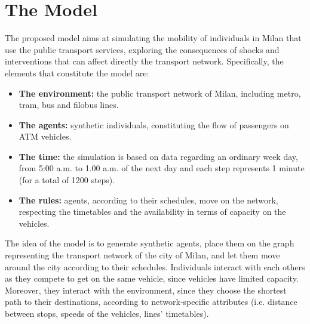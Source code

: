 \section{The Model}
The proposed model aims at simulating the mobility of individuals in Milan that use the public transport services, exploring the consequences of shocks and interventions that can affect directly the transport network. Specifically, the elements that constitute the model are:
\begin{itemize}
    \item \textbf{The environment:} the public transport network of Milan, including metro, tram, bus and filobus lines.
    \item \textbf{The agents:} synthetic individuals, constituting the flow of passengers on ATM vehicles.
    \item \textbf{The time:} the simulation is based on data regarding an ordinary week day, from 5:00 a.m. to 1.00 a.m. of the next day and each step represents 1 minute (for a total of 1200 steps).
    \item \textbf{The rules:} agents, according to their schedules, move on the network, respecting the timetables and the availability in terms of capacity on the vehicles.
\end{itemize}
The idea of the model is to generate synthetic agents, place them on the graph representing the transport network of the city of Milan, and let them move around the city according to their schedules. Individuals interact with each others as they compete to get on the same vehicle, since vehicles have limited capacity. Moreover, they interact with the environment, since they choose the shortest path to their destinations, according to network-specific attributes (i.e. distance between stops, speeds of the vehicles, lines' timetables). 

